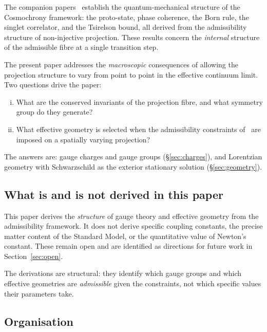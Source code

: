 \documentclass[11pt,a4paper]{article}
\begin{document}
      The companion papers~\cite{FoundationM,Q1,Q2} establish the quantum-mechanical
      structure of the Cosmochrony framework: the proto-state, phase coherence, the
      Born rule, the singlet correlator, and the Tsirelson bound, all derived from the
      admissibility structure of non-injective projection.
      These results concern the \emph{internal} structure of the admissible fibre at
      a single transition step.

      The present paper addresses the \emph{macroscopic} consequences of allowing the
      projection structure to vary from point to point in the effective continuum limit.
      Two questions drive the paper:
      \begin{enumerate}[(i)]
\item What are the conserved invariants of the projection fibre, and what
symmetry group do they generate?
\item What effective geometry is selected when the admissibility constraints
of~\cite{FoundationM} are imposed on a spatially varying projection?
      \end{enumerate}

      The answers are: gauge charges and gauge groups (§\ref{sec:charges}), and
      Lorentzian geometry with Schwarzschild as the exterior stationary solution
      (§\ref{sec:geometry}).

    \subsection*{What is and is not derived in this paper}

      This paper derives the \emph{structure} of gauge theory and effective geometry
      from the admissibility framework.
      It does not derive specific coupling constants, the precise matter content of
      the Standard Model, or the quantitative value of Newton's constant.
      These remain open and are identified as directions for future work in
      Section~\ref{sec:open}.

      The derivations are structural: they identify which gauge groups and which
      effective geometries are \emph{admissible} given the constraints, not which
      specific values their parameters take.

    \subsection*{Organisation}
\end{document}
